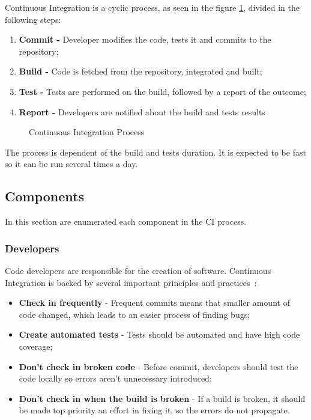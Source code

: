 Continuous Integration is a cyclic process, as seen in the figure \ref{fig:ci_process}, divided in the following steps:

\begin{enumerate}
\item \textbf{Commit -} Developer modifies the code, tests it and commits to the repository;
\item \textbf{Build -} Code is fetched from the repository, integrated and built;
\item \textbf{Test -} Tests are performed on the build, followed by a report of the outcome;
\item \textbf{Report -} Developers are notified about the build and tests results\\
\end{enumerate}

  \begin{figure}[H]
  \centering
      \caption{Continuous Integration Process}
      \label{fig:ci_process}
  \end{figure}

The process is dependent of the build and tests duration. It is expected to be fast so it can be run several times a day.

\subsection{Components}\label{sc:ciComponents}
In this section are enumerated each component in the CI process.

\subsubsection{Developers}
Code developers are responsible for the creation of software. Continuous Integration is backed by several important principles and practices~\cite{CIimproveSQRR}:  

\begin{itemize}
\item \textbf{Check in frequently} - Frequent commits means that smaller amount of code changed, which leads to an easier process of finding bugs;
\item \textbf{Create automated tests} - Tests should be automated and have high code coverage;
\item \textbf{Don’t check in broken code} - Before commit, developers should test the code locally so errors aren't unnecessary introduced;  
\item \textbf{Don’t check in when the build is broken} - If a build is broken, it should be made top priority an effort in fixing it, so the errors do not propagate.
\end{itemize}

